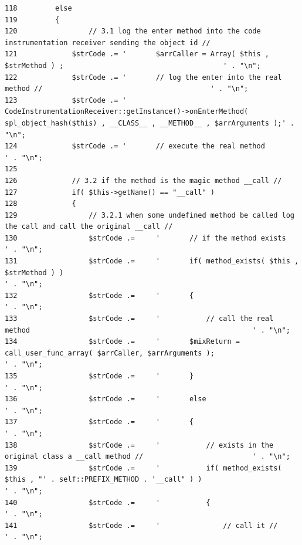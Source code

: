 \begin{Code}
\begin{verbatim}
118         else
119         {
120                 // 3.1 log the enter method into the code instrumentation receiver sending the object id //
121             $strCode .= '       $arrCaller = Array( $this , $strMethod ) ;                                      ' . "\n";
122             $strCode .= '       // log the enter into the real method //                                        ' . "\n";
123             $strCode .= '       CodeInstrumentationReceiver::getInstance()->onEnterMethod( spl_object_hash($this) , __CLASS__ , __METHOD__ , $arrArguments );' . "\n";
124             $strCode .= '       // execute the real method                                                      ' . "\n";
125             
126             // 3.2 if the method is the magic method __call //
127             if( $this->getName() == "__call" )
128             {
129                 // 3.2.1 when some undefined method be called log the call and call the original __call //
130                 $strCode .=     '       // if the method exists                                                                                                         ' . "\n";
131                 $strCode .=     '       if( method_exists( $this , $strMethod ) )                                                                               ' . "\n";
132                 $strCode .=     '       {                                                                               ' . "\n";
133                 $strCode .=     '           // call the real method                                                     ' . "\n";
134                 $strCode .=     '       $mixReturn = call_user_func_array( $arrCaller, $arrArguments );                         ' . "\n";
135                 $strCode .=     '       }                                                                               ' . "\n";
136                 $strCode .=     '       else                                                                            ' . "\n";
137                 $strCode .=     '       {                                                                               ' . "\n";
138                 $strCode .=     '           // exists in the original class a __call method //                          ' . "\n";
139                 $strCode .=     '           if( method_exists( $this , "' . self::PREFIX_METHOD . '__call" ) )                                   ' . "\n";
140                 $strCode .=     '           {                                                                           ' . "\n";
141                 $strCode .=     '               // call it //                                                           ' . "\n";

\end{verbatim}
\end{Code}
